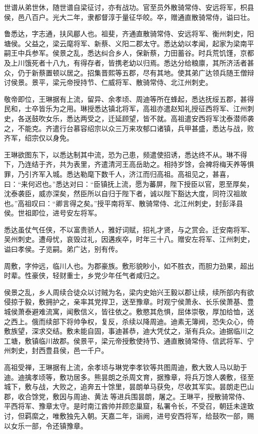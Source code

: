\documentclass[]{article}
\begin{document}
世谱从弟世休，随世谱自梁征讨，亦有战功。官至员外散骑常侍、安远将军，枳县侯，邑八百户。光大二年，隶都督淳于量征华皎。卒，赠通直散骑常侍，谥曰壮。

鲁悉达，字志通，扶风郿人也。祖斐，齐通直散骑常侍、安远将军、衡州刺史，阳塘侯。父益之，梁云麾将军、新蔡、义阳二郡太守。悉达幼以孝闻，起家为梁南平嗣王中兵参军。侯景之乱，悉达纠合乡人，保新蔡，力田蓄谷。时兵荒饥馑，京都及上川饿死者十八九，有得存者，皆携老幼以归焉。悉达分给粮廪，其所济活者甚众，仍于新蔡置顿以居之。招集晋熙等五郡，尽有其地。使其弟广达领兵随王僧辩讨侯景。景平，梁元帝授持节、仁威将军、散骑常侍、北江州刺史。

敬帝即位，王琳据有上流，留异、余孝顷、周迪等所在蜂起，悉达抚绥五郡，甚得民和，士卒皆乐为之用。琳授悉达镇北将军，高祖亦遣赵知礼授征西将军、江州刺史，各送鼓吹女乐，悉达两受之，迁延顾望，皆不就。高祖遣安西将军沈泰潜师袭之，不能克。齐遣行台慕容绍宗以众三万来攻郁口诸镇，兵甲甚盛，悉达与战，败齐军，绍宗仅以身免。

王琳欲图东下，以悉达制其中流，恐为己患，频遣使招诱，悉达终不从。琳不得下，乃连结于齐，共为表里，齐遣清河王高岳助之。相持岁馀，会裨将梅天养等惧罪，乃引齐军入城。悉达勒麾下数千人，济江而归高祖。高祖见之，甚喜，曰：``来何迟也。''悉达对曰：``臣镇抚上流，愿为蕃屏，陛下授臣以官，恩至厚矣，沈泰袭臣，威亦深矣，然臣所以自归于陛下者，诚以陛下豁达大度，同符汉祖故也。''高祖叹曰：``卿言得之矣。''授平南将军、散骑常侍、北江州刺史，封彭泽县侯。世祖即位，进号安左将军。

悉达虽仗气任侠，不以富贵骄人，雅好词赋，招礼才贤，与之赏会。迁安南将军、吴州刺史。遭母忧，哀毁过礼，因遘疾卒，时年三十八。赠安左将军、江州刺史，谥曰孝侯。子览嗣。弟广达，别有传。

周敷，字仲远，临川人也。为郡豪族。敷形貌眇小，如不胜衣，而胆力劲果，超出时辈。性豪侠，轻财重士，乡党少年任气者咸归之。

侯景之乱，乡人周续合徒众以讨贼为名，梁内史始兴王毅以郡让续，续所部内有欲侵掠于毅，敷拥护之，亲率其党捍卫，送至豫章。时观宁侯萧永、长乐侯萧基、豊城侯萧泰避难流寓，闻敷信义，皆往依之。敷愍其危惧，屈体崇敬，厚加给恤，送之西上。俄而续部下将帅争权，复反，杀续以降周迪。迪素无簿阀，恐失众心，倚敷族望，深求交结。敷未能自固，事迪甚恭，迪大凭仗之，渐有兵众。迪据临川之工塘，敷镇临川故郡。侯景平，梁元帝授敷使持节、通直散骑常侍、信武将军、宁州刺史，封西豊县侯，邑一千户。

高祖受禅，王琳据有上流，余孝顷与琳党李孝钦等共图周迪，敷大致人马以助于迪。迪擒孝顷等，敷功居多。熊昙朗之杀周文育，据豫章，将兵万馀人袭敷，径至城下，敷与战，大败之，追奔五十馀里，昙朗单马获免，尽收其军实。昙朗走巴山郡，收合馀党，敷因与周迪、黄法等进兵围昙朗，屠之。王琳平，授散骑常侍、平西将军、豫章太守。是时南江酋帅并顾恋巢窟，私署令长，不受召，朝廷未遑致讨，但羁縻之，唯敷独先入朝。天嘉二年，诣阙，进号安西将军，给鼓吹一部，赐以女乐一部，令还镇豫章。
\end{document}
